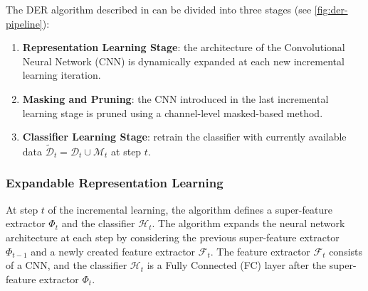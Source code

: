 The DER algorithm described in \cite{yan2021dynamically} can be divided into three stages (see \autoref{fig:der-pipeline}):
\begin{enumerate}
    \item \textbf{Representation Learning Stage}: the architecture of the Convolutional Neural Network (CNN) is dynamically expanded at each new incremental learning iteration.
    \item \textbf{Masking and Pruning}: the CNN introduced in the last incremental learning stage is pruned using a channel-level masked-based method.
    \item \textbf{Classifier Learning Stage}: retrain the classifier with currently available data $\tilde{\mathcal{D}}_t = \mathcal{D}_t \cup \mathcal{M}_t$ at step $t$.
\end{enumerate}

\subsubsection{Expandable Representation Learning}
At step $t$ of the incremental learning, the algorithm defines a super-feature extractor $\Phi_t$ and the classifier $\mathcal{H}_t$. The algorithm expands the neural network architecture at each step by considering the previous super-feature extractor $\Phi_{t-1}$ and a newly created feature extractor $\mathcal{F}_t$. The feature extractor $\mathcal{F}_t$ consists of a CNN, and the classifier $\mathcal{H}_t$ is a Fully Connected (FC) layer after the super-feature extractor $\Phi_t$.


